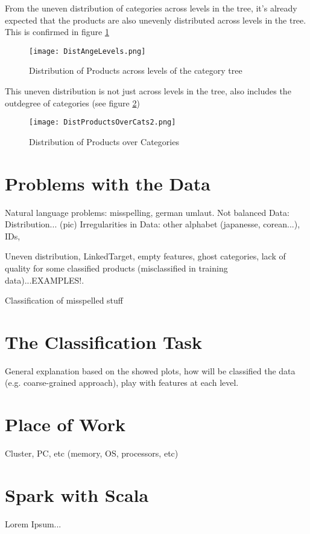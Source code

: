 From the uneven distribution of categories across levels in the tree, it's already expected that the products are also unevenly distributed across levels in the tree. This is confirmed in figure \ref{fig:productsDist}
\begin{figure}[!htbp]
  \centering
  \texttt{[image: DistAngeLevels.png]}\\
  \caption{Distribution of Products across levels of the category tree}
  \label{fig:productsDist}
\end{figure}

This uneven distribution is not just across levels in the tree, also includes the outdegree of categories (see figure \ref{fig:distProdCats})

\begin{figure}[!htbp]
  \centering
  \texttt{[image: DistProductsOverCats2.png]}\\
  \caption{Distribution of Products over Categories}
  \label{fig:distProdCats}
\end{figure}

\section{Problems with the Data\label{sec:conceptlayerx}}
Natural language problems: misspelling, german umlaut. 
Not balanced Data: Distribution... (pic)
Irregularities in Data: other alphabet (japanesse, corean...), IDs,

Uneven distribution, LinkedTarget, empty features, ghost categories, lack of quality for some classified products (misclassified in training data)...EXAMPLES!. 

Classification of misspelled stuff

\section{The Classification Task}
General explanation based on the showed plots, how will be classified the data (e.g. coarse-grained approach), play with features at each level.

\section{Place of Work\label{sec:conceptinter}}

Cluster, PC, etc (memory, OS, processors, etc)

\section{Spark with Scala\label{sec:intspec}}

Lorem Ipsum...

